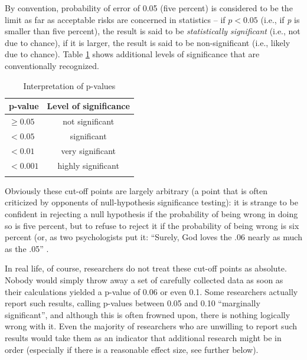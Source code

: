 By convention, probability of error of 0.05 (five percent) is considered to be the limit as far as acceptable risks are concerned in statistics -- if $p < 0.05$ (i.e., if \textit{p} is smaller than five percent), the result is said to be \textit{statistically significant} (i.e., not due to chance), if it is larger, the result is said to be non-significant (i.e., likely due to chance). Table \ref{tab:plevels} shows additional levels of significance that are conventionally recognized.

\begin{table}[!htbp]
\caption{Interpretation of p-values}
\label{tab:plevels}
\begin{tabular}[t]{lc}
\lsptoprule
p-value & Level of significance \\
\midrule
$\geq 0.05$ & not significant \\
$< 0.05$ & significant \\
$< 0.01$ & very significant \\
$< 0.001$ & highly significant \\
\lspbottomrule
\end{tabular}
\end{table}

Obviously these cut-off points are largely arbitrary (a point that is often criticized by opponents of null-hypothesis significance testing): it is strange to be confident in rejecting a null hypothesis if the probability of being wrong in doing so is five percent, but to refuse to reject it if the probability of being wrong is six percent (or, as two psychologists put it: ``Surely, God loves the .06 nearly as much as the .05'' \citep[1277]{rosnow_statistical_1989}.

In real life, of course, researchers do not treat these cut-off points as absolute. Nobody would simply throw away a set of carefully collected data as soon as their calculations yielded a p-value of 0.06 or even 0.1. Some researchers actually report such results, calling p-values between 0.05 and 0.10 ``marginally significant'', and although this is often frowned upon, there is nothing logically wrong with it. Even the majority of researchers who are unwilling to report such results would take them as an indicator that additional research might be in order (especially if there is a reasonable effect size, see further below).

